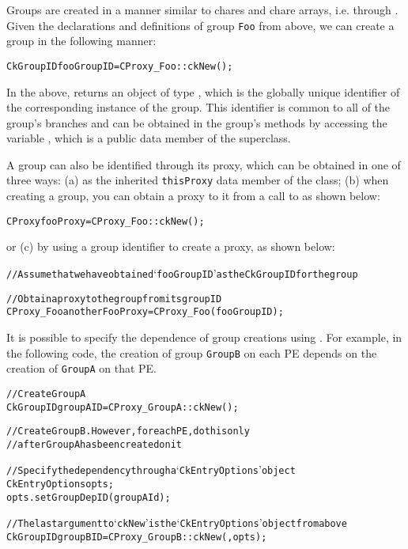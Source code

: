 Groups are created in a manner similar to chares and chare arrays, i.e. 
through . Given the declarations and definitions of group {\tt Foo}
from above, we can create a group in the following manner:

\begin{alltt}
CkGroupID fooGroupID = CProxy_Foo::ckNew();
\end{alltt}

In the above,  returns an object of type ,
which is the globally unique identifier of the corresponding instance
of the group.  This identifier is common to all of the group's
branches and can be obtained in the group's methods by accessing the variable
, which is a public data member of the 
superclass.

A group can also be identified through its proxy, which can be obtained in one of three ways:
(a) as the inherited {\tt thisProxy} data member of the class; (b) when creating a group,
you can obtain a proxy to it from a call to  
as shown below:

\begin{alltt}
CProxy fooProxy = CProxy_Foo::ckNew();
\end{alltt}

or (c) by using a group identifier to create a proxy, as shown below:

\begin{alltt}
// Assume that we have obtained `fooGroupID' as the CkGroupID for the group

// Obtain a proxy to the group from its group ID
CProxy_Foo anotherFooProxy = CProxy_Foo(fooGroupID);
\end{alltt}

It is possible to specify the dependence of group creations using
. For example, in the following code, the creation of group
{\tt GroupB} on each PE depends on the creation of {\tt GroupA} on that PE.

\begin{alltt}
// Create GroupA
CkGroupID groupAID = CProxy_GroupA::ckNew();

// Create GroupB. However, for each PE, do this only 
// after GroupA has been created on it

// Specify the dependency through a `CkEntryOptions' object
CkEntryOptions opts;
opts.setGroupDepID(groupAId);

// The last argument to `ckNew' is the `CkEntryOptions' object from above
CkGroupID groupBID = CProxy_GroupB::ckNew(, opts);
\end{alltt}

